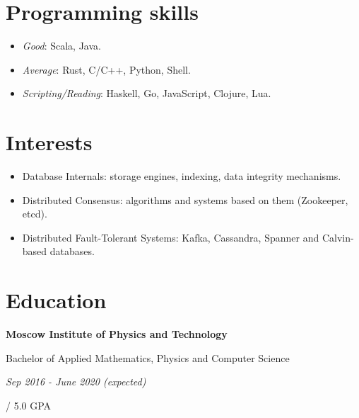 \documentclass[paper=a4,fontsize=15pt]{scrartcl}
\newcommand{\quarterspace}{\vspace*{0.25em}}
\begin{document}
\section*{Programming skills}{}
\begin{itemize}[noitemsep,leftmargin=20pt,label=\raisebox{0.25ex}{\tiny$\bullet$},topsep=5pt]
    \item \textit{Good}: Scala, Java.
    \item \textit{Average}: Rust, C/C++, Python, Shell.
    \item \textit{Scripting/Reading}: Haskell, Go, JavaScript, Clojure, Lua.
\end{itemize}

\section*{Interests}{}
\begin{itemize}[noitemsep,leftmargin=20pt,label=\raisebox{0.25ex}{\tiny$\bullet$},topsep=5pt]
    \item Database Internals: storage engines, indexing, data integrity mechanisms.
    \item Distributed Consensus: algorithms and systems based on them (Zookeeper, etcd).
    \item Distributed Fault-Tolerant Systems: Kafka, Cassandra, Spanner and Calvin-based databases.
\end{itemize}
\section*{Education}{}
\noindent \textbf{Moscow Institute of Physics and Technology} \par
\noindent Bachelor of Applied Mathematics, Physics and Computer Science \par
\quarterspace
\footnotesize
\noindent \textit{Sep 2016 - June 2020 (expected)} \par
{} / 5.0 GPA
\end{document}
